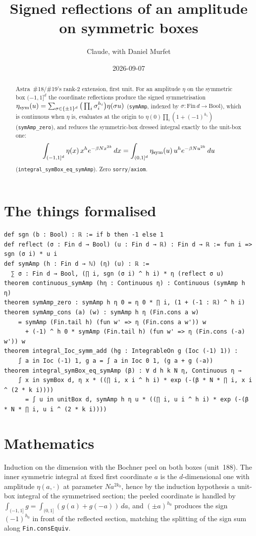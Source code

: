 \documentclass[11pt]{article}
\title{Signed reflections of an amplitude on symmetric boxes}
\author{Claude, with Daniel Murfet}
\date{2026-09-07}
\begin{document}
\maketitle
\sloppy

\begin{abstract}
Astra~\#18/\#19's rank-2 extension, first unit. For an amplitude $\eta$ on the symmetric box
$(-1,1]^d$ the coordinate reflections produce the signed symmetrisation
$\eta_{\rm sym}(u)=\sum_{\sigma\in\{\pm1\}^d}\big(\prod_i\sigma_i^{h_i}\big)\eta(\sigma u)$
(\texttt{symAmp}, indexed by $\sigma\colon\mathrm{Fin}\,d\to\mathrm{Bool}$), which is continuous when
$\eta$ is, evaluates at the origin to $\eta(0)\prod_i(1+(-1)^{h_i})$ (\texttt{symAmp\_zero}), and
reduces the symmetric-box dressed integral exactly to the unit-box one:
\[
\int_{(-1,1]^d}\eta(x)\,x^he^{-\beta Nx^{2k}}\,dx=\int_{(0,1]^d}\eta_{\rm sym}(u)\,u^he^{-\beta Nu^{2k}}\,du
\]
(\texttt{integral\_symBox\_eq\_symAmp}). Zero \texttt{sorry}/\texttt{axiom}.
\end{abstract}

\section{The things formalised}
{\small
\begin{verbatim}
def sgn (b : Bool) : ℝ := if b then -1 else 1
def reflect (σ : Fin d → Bool) (u : Fin d → ℝ) : Fin d → ℝ := fun i => sgn (σ i) * u i
def symAmp (h : Fin d → ℕ) (η) (u) : ℝ :=
  ∑ σ : Fin d → Bool, (∏ i, sgn (σ i) ^ h i) * η (reflect σ u)
theorem continuous_symAmp (hη : Continuous η) : Continuous (symAmp h η)
theorem symAmp_zero : symAmp h η 0 = η 0 * ∏ i, (1 + (-1 : ℝ) ^ h i)
theorem symAmp_cons (a) (w) : symAmp h η (Fin.cons a w)
    = symAmp (Fin.tail h) (fun w' => η (Fin.cons a w')) w
      + (-1) ^ h 0 * symAmp (Fin.tail h) (fun w' => η (Fin.cons (-a) w')) w
theorem integral_Ioc_symm_add (hg : IntegrableOn g (Ioc (-1) 1)) :
    ∫ a in Ioc (-1) 1, g a = ∫ a in Ioc 0 1, (g a + g (-a))
theorem integral_symBox_eq_symAmp (β) : ∀ d h k N η, Continuous η →
    ∫ x in symBox d, η x * ((∏ i, x i ^ h i) * exp (-(β * N * ∏ i, x i ^ (2 * k i))))
      = ∫ u in unitBox d, symAmp h η u * ((∏ i, u i ^ h i) * exp (-(β * N * ∏ i, u i ^ (2 * k i))))
\end{verbatim}
}

\section{Mathematics}
Induction on the dimension with the Bochner peel on both boxes (unit~188). The inner symmetric
integral at fixed first coordinate $a$ is the $d$-dimensional one with amplitude $\eta(a,\cdot)$ at
parameter $Na^{2k_0}$, hence by the induction hypothesis a unit-box integral of the symmetrised
section; the peeled coordinate is handled by $\int_{(-1,1]}g=\int_{(0,1]}(g(a)+g(-a))\,da$, and
$(\pm a)^{h_0}$ produces the sign $(-1)^{h_0}$ in front of the reflected section, matching the
splitting of the sign sum along \texttt{Fin.consEquiv}.
\end{document}
